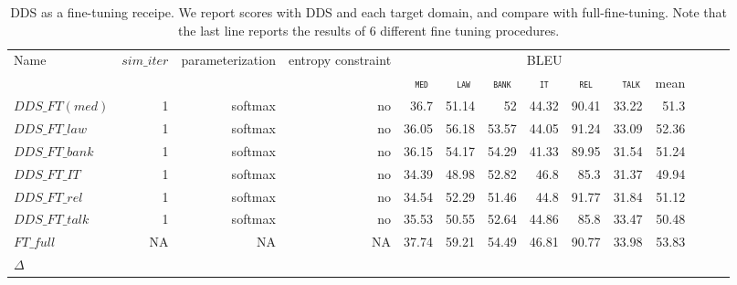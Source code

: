 \documentclass[11pt,a4paper]{article}
\newcommand{\domain}[1]{\texttt{\textsc{#1}}}
\newcommand{\system}[1]{\texttt{{#1}}}
\begin{document}


\begin{table}[htb]
  \centering%
  \begin{adjustbox}{width=1.0\textwidth,center}
  \begin{tabular}{|p{3.0cm}|*{13}{r|}} \hline
    \multirow{2}{*}{Name} & \multirow{2}{*}{$sim\_iter$} & \multirow{2}{*}{parameterization} & \multirow{2}{*}{entropy constraint} & \multicolumn{7}{|c|}{BLEU} \\ \cline{5-11}	
   & & & & \multicolumn{1}{c|}{\domain{ med}} & \multicolumn{1}{c|}{\domain{ law}} & \multicolumn{1}{c|}{\domain{bank}} & \multicolumn{1}{c|}{\domain{it}} & \multicolumn{1}{c|}{\domain{ rel }} & \multicolumn{1}{c|}{\domain{ talk}} & \multicolumn{1}{c|}{mean} \\
    \hline
  \system{$DDS\_FT (med)$} & 1 & softmax & no & 36.7&51.14&52&44.32&90.41&33.22&51.3\\
  \system{$DDS\_FT\_law$} & 1 & softmax & no &36.05&56.18&53.57&44.05&91.24&33.09&52.36\\
  \system{$DDS\_FT\_bank$} & 1 & softmax & no &36.15&54.17&54.29&41.33&89.95&31.54&51.24 \\
  \system{$DDS\_FT\_IT$} & 1 & softmax & no &34.39&48.98&52.82&46.8&85.3&31.37&49.94 \\
  \system{$DDS\_FT\_rel$} & 1 & softmax & no & 34.54&52.29&51.46&44.8&91.77&31.84&51.12\\
  \system{$DDS\_FT\_talk$} & 1 & softmax & no & 35.53&50.55&52.64&44.86&85.8&33.47&50.48\\
  \system{$FT\_full$} & NA & NA & NA & 37.74&59.21	&54.49&46.81&90.77&33.98&53.83\\
    \hline
    $\Delta$ & \\
  \end{tabular}
  \end{adjustbox}
  \caption{DDS as a fine-tuning receipe. We report scores with DDS and each target domain, and compare with full-fine-tuning. Note that the last line reports the results of 6 different fine tuning procedures.}
  \label{tab:finetuning}
\end{table}
\end{document}
